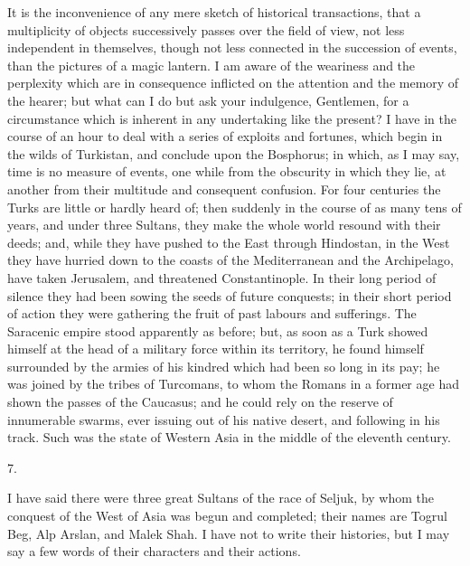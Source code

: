 It is the inconvenience of any
mere sketch of historical transactions, that a multiplicity of objects
successively passes over the field of view, not less independent in themselves, though not less connected in the succession of events,
than the pictures of a magic lantern. I am aware of the weariness and
the perplexity which are in consequence inflicted on the attention and
the memory of the hearer; but what can I do but ask your indulgence,
Gentlemen, for a circumstance which is inherent in any undertaking
like the present? I have in the course of an hour to deal with a
series of exploits and fortunes, which begin in the wilds of Turkistan,
and conclude upon the Bosphorus; in which, as I may say, time is no
measure of events, one while from the obscurity in which they lie, at
another from their multitude and consequent confusion. For four
centuries the Turks are little or hardly heard of; then suddenly in
the course of as many tens of years, and under three Sultans, they
make the whole world resound with their deeds; and, while they have
pushed to the East through Hindostan, in the West they have hurried
down to the coasts of the Mediterranean and the Archipelago, have
taken Jerusalem, and threatened Constantinople. In their long period
of silence they had been sowing the seeds of future conquests; in
their short period of action they were gathering the fruit of past
labours and sufferings. The Saracenic empire stood apparently as
before; but, as soon as a Turk showed himself at the head of a
military force within its territory, he found himself surrounded by
the armies of his kindred which had been so long in its pay; he was
joined by the tribes of Turcomans, to whom the Romans in a former age
had shown the passes of the Caucasus; and he could rely on the reserve
of innumerable swarms, ever issuing out of his native desert, and
following in his track. Such was the state of Western Asia in the
middle of the eleventh century.

7.

I have said there were three
great Sultans of the race of Seljuk, by whom the conquest of the West
of Asia was begun and completed; their names are Togrul Beg, Alp
Arslan, and Malek Shah. I have not to write their histories, but I may
say a few words of their characters and their actions.

